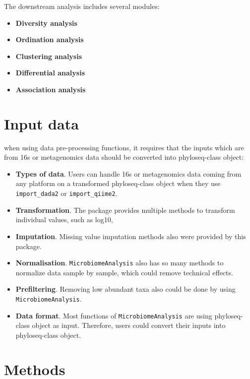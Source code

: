 \documentclass[
]{book}
\providecommand{\tightlist}{%
  \setlength{\itemsep}{0pt}\setlength{\parskip}{0pt}}
\begin{document}
The downstream analysis includes several modules:

\begin{itemize}
\tightlist
\item
  \textbf{Diversity analysis}
\item
  \textbf{Ordination analysis}
\item
  \textbf{Clustering analysis}
\item
  \textbf{Differential analysis}
\item
  \textbf{Association analysis}
\end{itemize}

\hypertarget{input-data}{%
\section{Input data}\label{input-data}}

when using data pre-processing functions, it requires that the inputs which are from 16s or metagenomics data should be converted into phyloseq-class object:

\begin{itemize}
\item
  \textbf{Types of data}. Users can handle 16s or metagenomics data coming from any platform on a transformed phyloseq-class object when they use \texttt{import\_dada2} or \texttt{import\_qiime2}.
\item
  \textbf{Transformation}. The package provides multiple methods to transform individual values, such as log10,
\item
  \textbf{Imputation}. Missing value imputation methods also were provided by this package.
\item
  \textbf{Normalisation}. \texttt{MicrobiomeAnalysis} also has so many methods to normalize data sample by sample, which could remove technical effects.
\item
  \textbf{Prefiltering}. Removing low abundant taxa also could be done by using \texttt{MicrobiomeAnalysis}.
\item
  \textbf{Data format}. Most functions of \texttt{MicrobiomeAnalysis} are using phyloseq-class object as input. Therefore, users could convert their inputs into phyloseq-class object.
\end{itemize}

\hypertarget{methods}{%
\section{Methods}\label{methods}}
\end{document}
